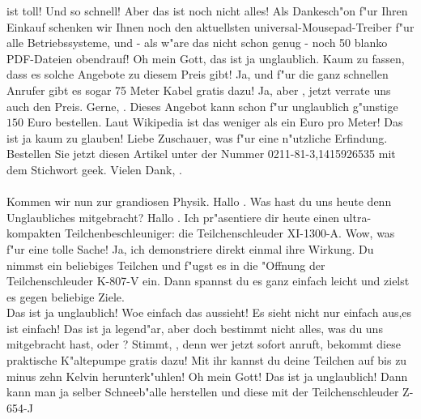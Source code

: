 \begin{verseplay}[5em]
                ist toll!
\s{\QEDGuestA} Und so schnell! Aber das ist noch nicht alles! Als 
                Dankesch"on f"ur Ihren Einkauf schenken wir Ihnen noch den 
                aktuellsten universal-Mousepad-Treiber f"ur alle Betriebssysteme, 
                und - als w"are das nicht schon genug - noch 50 blanko PDF-Dateien 
                obendrauf!
\s{\QEDHost} Oh mein Gott, das ist ja unglaublich. Kaum zu fassen, dass es 
                solche Angebote zu diesem Preis gibt!
\s{\QEDGuestA} Ja, und f"ur die ganz schnellen Anrufer gibt es sogar 75 
                Meter Kabel gratis dazu! 
\s{\QEDHost} Ja, aber \QEDGuestA, jetzt verrate uns auch den Preis.
\s{\QEDGuestA} Gerne, \QEDHost. Dieses Angebot kann schon f"ur unglaublich 
                g"unstige $150$ Euro bestellen. Laut Wikipedia ist das weniger als 
                ein Euro pro Meter!
\s{\QEDHost} Das ist ja kaum zu glauben! Liebe Zuschauer, was f"ur eine 
                n"utzliche Erfindung. Bestellen Sie jetzt diesen Artikel unter der 
                Nummer 0211-81-3,1415926535 mit dem Stichwort geek.
                Vielen Dank, \QEDGuestA.\\
                \\
                Kommen wir nun zur grandiosen Physik. Hallo \QEDGuestB. Was hast 
                du uns heute denn Unglaubliches mitgebracht?
\s{\QEDGuestB} Hallo \QEDHost. Ich pr"asentiere dir heute einen 
                ultra-kompakten Teilchenbeschleuniger: die Teilchenschleuder 
                XI-1300-A.
\s{\QEDHost} Wow, was f"ur eine tolle Sache!
\s{\QEDGuestB} Ja, ich demonstriere direkt einmal ihre  Wirkung. Du nimmst 
                ein beliebiges Teilchen und f"ugst es in die "Offnung der 
                Teilchenschleuder K-807-V ein. Dann spannst du es ganz einfach 
                leicht und zielst es gegen beliebige Ziele.\\
\s{\QEDHost} Das ist ja unglaublich! Woe einfach das aussieht!
\s{\QEDGuestB} Es sieht nicht nur einfach aus,es ist einfach!
\s{\QEDHost} Das ist ja legend"ar,  aber doch bestimmt nicht alles, was du 
                uns mitgebracht hast, oder \QEDGuestB?
\s{\QEDGuestB} Stimmt, \QEDHost, denn wer jetzt sofort anruft, bekommt 
                diese praktische K"altepumpe gratis dazu! Mit ihr kannst du deine 
                Teilchen auf bis zu minus zehn Kelvin herunterk"uhlen!
\s{\QEDHost} Oh mein Gott! Das ist ja unglaublich! Dann kann man ja selber 
                Schneeb"alle herstellen und diese mit der Teilchenschleuder Z-654-J 

\end{verseplay}
